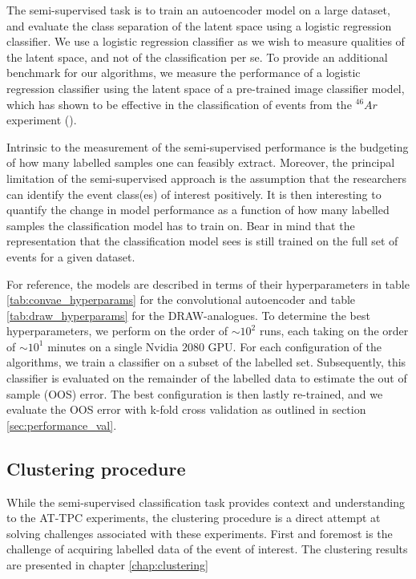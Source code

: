 The semi-supervised task is to train an autoencoder model on a large dataset, and evaluate the class separation of the latent space using a logistic regression classifier. We use a logistic regression classifier as we wish to measure qualities of the latent space, and not of the classification per se. To provide an additional benchmark for our algorithms, we measure the performance of a logistic regression classifier using the latent space of a pre-trained image classifier model, which has shown to be effective in the classification of events from the ${}^{46}Ar$ experiment (\cite{Kuchera2019}).

Intrinsic to the measurement of the semi-supervised performance is the budgeting of how many labelled samples one can feasibly extract. Moreover, the principal limitation of the semi-supervised approach is the assumption that the researchers can identify the event class(es) of interest positively. It is then interesting to quantify the change in model performance as a function of how many labelled samples the classification model has to train on. Bear in mind that the representation that the classification model sees is still trained on the full set of events for a given dataset. 

For reference, the models are described in terms of their hyperparameters in table \ref{tab:convae_hyperparams} for the convolutional autoencoder and table \ref{tab:draw_hyperparams} for the DRAW-analogues. To determine the best hyperparameters, we perform on the order of $\sim 10^2$ runs, each taking on the order of $\sim 10^1$ minutes on a single Nvidia $2080$ GPU. For each configuration of the algorithms, we train a classifier on a subset of the labelled set. Subsequently, this classifier is evaluated on the remainder of the labelled data to estimate the out of sample (OOS) error. The best configuration is then lastly re-trained, and we evaluate the OOS error with k-fold cross validation as outlined in section \ref{sec:performance_val}.

\subsection{Clustering procedure}

While the semi-supervised classification task provides context and understanding to the AT-TPC experiments, the clustering procedure is a direct attempt at solving challenges associated with these experiments. First and foremost is the challenge of acquiring labelled data of the event of interest. The clustering results are presented in chapter \ref{chap:clustering} 

